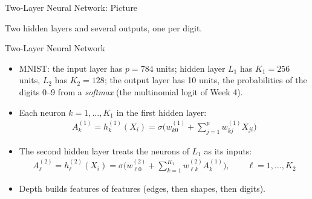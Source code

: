 \documentclass[aspectratio=169,11pt,xcolor=dvipsnames]{beamer}
\begin{document}
\begin{frame}{Two-Layer Neural Network: Picture}
\begin{center}
\end{center}
\vskip-6pt
{\footnotesize Two hidden layers and several outputs, one per digit.}
\end{frame}

\begin{frame}{Two-Layer Neural Network}
\begin{itemize}\itemsep4pt
  \item MNIST: the input layer has $p = 784$ units; hidden layer $L_1$ has $K_1 = 256$
        units, $L_2$ has $K_2 = 128$; the output layer has 10 units, the
        probabilities of the digits 0--9 from a \textit{softmax} (the multinomial
        logit of Week 4).
  \item Each neuron $k = 1, \dots, K_1$ in the first hidden layer:
  \begin{align*}
    A_k^{(1)} = h_k^{(1)}(X_i) = \sigma\Big(w_{k0}^{(1)} + \sum_{j=1}^{p} w_{kj}^{(1)} X_{ji}\Big)
  \end{align*}
  \item The second hidden layer treats the neurons of $L_1$ as its inputs:
  \begin{align*}
    A_\ell^{(2)} = h_\ell^{(2)}(X_i) = \sigma\Big(w_{\ell 0}^{(2)} + \sum_{k=1}^{K_1} w_{\ell k}^{(2)} A_k^{(1)}\Big),
    \qquad \ell = 1, \dots, K_2
  \end{align*}
  \item Depth builds features of features (edges, then shapes, then digits).
\end{itemize}
\end{frame}
\end{document}
